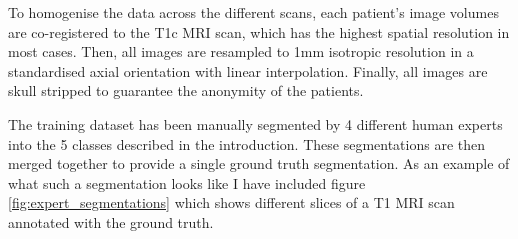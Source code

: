 \documentclass[12pt,a4paper,twoside,openright]{report}
\begin{document}
To homogenise the data across the different scans, each patient's image volumes are co-registered to the T1c MRI scan, which has the highest spatial resolution in most cases. Then, all images are resampled to 1mm isotropic resolution in a standardised axial orientation with linear interpolation. Finally, all images are skull stripped to guarantee the anonymity of the patients.

The training dataset has been manually segmented by 4 different human experts into the 5 classes described in the introduction. These segmentations are then merged together to provide a single ground truth segmentation. As an example of what such a segmentation looks like I have included figure \ref{fig:expert_segmentations} which shows different slices of a T1 MRI scan annotated with the ground truth.
\end{document}
